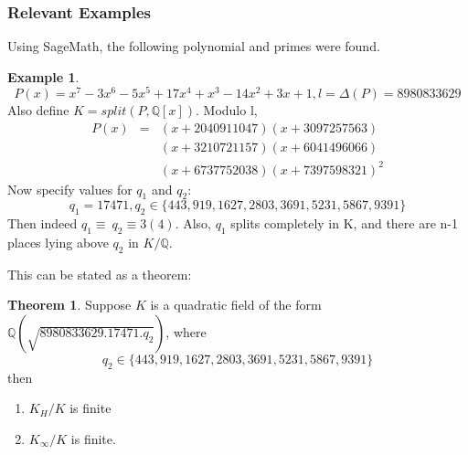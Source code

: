 \documentclass[12pt]{extarticle}
\newcommand{\<}{\langle}
\renewcommand{\>}{\rangle}
\theoremstyle{definition}
\newtheorem{theorem}{Theorem}
\newtheorem*{example}{Example}
\begin{document}
\subsubsection*{Relevant Examples}
Using SageMath, the following polynomial and primes were found. 
\begin{example}
\begin{equation}
    P(x) = x^7-3x^6-5x^5+17x^4+x^3-14x^2+3x+1, l=\Delta(P)=8980833629
\end{equation}
Also define $K=split(P,\mathbb{Q}[x])$. Modulo l,
\begin{eqnarray*}
        P(x)&=&(x+2040911047)(x+3097257563)\\ & & {} (x+3210721157)(x+6041496066)\\ & & {}(x+6737752038)(x+7397598321)^2
\end{eqnarray*}
Now specify values for $q_1$ and $q_2$:
\begin{equation}
    q_1=17471,q_2\in\{443,919,1627,2803,3691,5231,5867,9391\}
\end{equation}
Then indeed $q_1\equiv\:q_2\equiv3(4)$. Also, $q_1$ splits completely in K, and there are n-1 places lying above $q_2$ in $K/\mathbb{Q}$.
\end{example}
This can be stated as a theorem:
\begin{theorem}
    Suppose $K$ is a quadratic field of the form $\mathbb{Q}(\sqrt{8980833629.17471.q_2})$, where 
    \begin{equation}
        q_2\in\{443,919,1627,2803,3691,5231,5867,9391\}
    \end{equation}
    then \begin{enumerate}
        \item $K_H/K$ is finite
        \item $K_\infty/K$ is finite.
    \end{enumerate}
\end{theorem}
\end{document}
